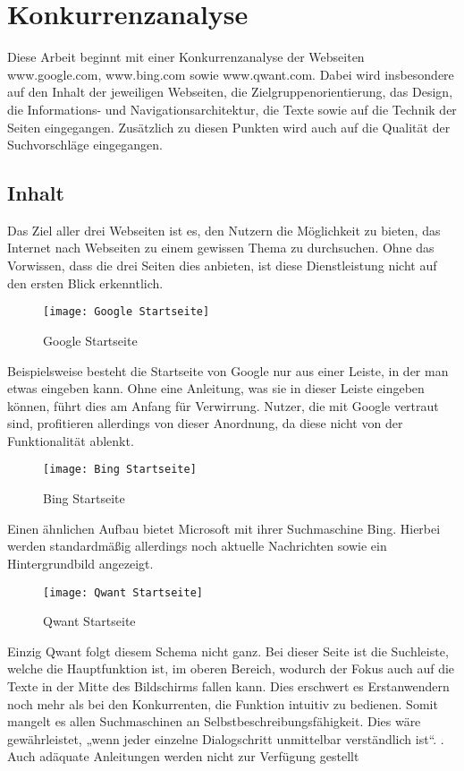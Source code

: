 



\section{Konkurrenzanalyse}
Diese Arbeit beginnt mit einer Konkurrenzanalyse der Webseiten www.google.com, www.bing.com sowie www.qwant.com.
Dabei wird insbesondere auf den Inhalt der jeweiligen Webseiten, die Zielgruppenorientierung, das Design, die Informations-
und Navigationsarchitektur, die Texte sowie auf die Technik der Seiten eingegangen. Zusätzlich zu diesen Punkten wird auch
auf die Qualität der Suchvorschläge eingegangen.

\subsection{Inhalt}
Das Ziel aller drei Webseiten ist es, den Nutzern die Möglichkeit zu bieten, das Internet nach Webseiten zu einem gewissen
Thema zu durchsuchen. Ohne das Vorwissen, dass die drei Seiten dies anbieten, ist diese Dienstleistung nicht auf den ersten
Blick erkenntlich.
\begin{figure}[h]
    \centering
    \texttt{[image: Google Startseite]}
    \caption{Google Startseite}
\end{figure}

Beispielsweise besteht die Startseite von Google nur aus einer Leiste, in der man etwas eingeben kann.
Ohne eine Anleitung, was sie in dieser Leiste eingeben können, führt dies am Anfang für Verwirrung. Nutzer, die mit Google
vertraut sind, profitieren allerdings von dieser Anordnung, da diese nicht von der Funktionalität ablenkt.
\begin{figure}[h]
    \centering
    \texttt{[image: Bing Startseite]}
    \caption{Bing Startseite}
\end{figure}
Einen ähnlichen
Aufbau bietet Microsoft mit ihrer Suchmaschine Bing. Hierbei werden standardmäßig allerdings noch aktuelle Nachrichten sowie
ein Hintergrundbild angezeigt.
\begin{figure}[h]
    \centering
    \texttt{[image: Qwant Startseite]}
    \caption{Qwant Startseite}
\end{figure}
Einzig Qwant folgt diesem Schema nicht ganz. Bei dieser Seite ist die Suchleiste, welche die
Hauptfunktion ist, im oberen Bereich, wodurch der Fokus auch auf die Texte in der Mitte des Bildschirms fallen kann. Dies
erschwert es Erstanwendern noch mehr als bei den Konkurrenten, die Funktion intuitiv zu bedienen. Somit mangelt es allen
Suchmaschinen an Selbstbeschreibungsfähigkeit. Dies wäre gewährleistet, „wenn jeder einzelne Dialogschritt unmittelbar
verständlich ist“\cite[Seite 6]{Maulhardt.20220506}.
. Auch adäquate Anleitungen werden nicht zur Verfügung gestellt

